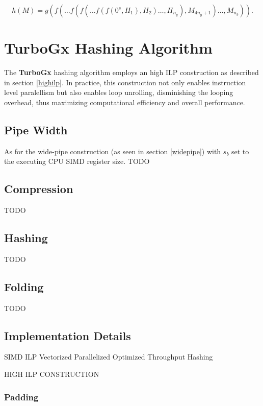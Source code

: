 \documentclass[11pt]{article}
\begin{document}
\begin{equation*}
h(M) = g\left( f( \ldots f(f(\ldots f(f(0^s, H_1), H_2) \ldots, H_{n_g}), M_{4{n_g}+1}) \ldots, M_{n_b} ) \right).
\end{equation*}

\section{TurboGx Hashing Algorithm}

The \textbf{TurboGx} hashing algorithm employs an high ILP construction as described in section \ref{highilp}. In practice, this construction not only enables instruction level paralellism but also enables loop unrolling, disminishing the looping overhead, thus maximizing computational efficiency and overall performance. 

\subsection{Pipe Width}
As for the wide-pipe construction (as seen in section \ref{widepipe}) with \( s_b \) set to the executing CPU SIMD register size.
TODO

\subsection{Compression}

TODO

\subsection{Hashing}

TODO

\subsection{Folding}

TODO

\subsection{Implementation Details}

SIMD
ILP
Vectorized
Parallelized
Optimized
Throughput
Hashing

HIGH ILP CONSTRUCTION

\subsubsection{Padding}
\end{document}
